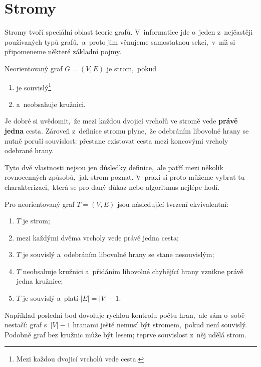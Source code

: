 \section{Stromy}\label{sec:stromy}

Stromy tvoří speciální oblast teorie grafů. V~informatice jde o~jeden z~nejčastěji používaných typů grafů,~a~proto jim věnujeme samostatnou sekci,~v~níž si připomeneme některé základní pojmy.

\begin{definition}[Strom]\label{def:strom}
    Neorientovaný graf $G=(V,E)$ je strom,~pokud
    \begin{enumerate}[label=(\roman*)]
        \item je souvislý\footnote{Mezi každou dvojicí vrcholů vede cesta.}
        \item a~neobsahuje kružnici.
    \end{enumerate}
\end{definition}

Je dobré si uvědomit,~že mezi každou dvojicí vrcholů ve stromě vede \textbf{právě jedna} cesta. Zároveň z~definice stromu plyne,~že odebráním libovolné hrany se nutně poruší souvislost: přestane existovat cesta mezi koncovými vrcholy odebrané hrany.

Tyto dvě vlastnosti nejsou jen důsledky definice,~ale patří mezi několik rovnocenných způsobů,~jak strom poznat. V~praxi si proto můžeme vybrat tu charakterizaci,~která se pro daný důkaz nebo algoritmus nejlépe hodí.

\begin{theorem}\label{thm:charakterizace_stromu}
    Pro neorientovaný graf $T=(V,E)$ jsou následující tvrzení ekvivalentní:
    \begin{enumerate}[label=(\roman*)]
        \item $T$ je strom;
        \item mezi každými dvěma vrcholy vede právě jedna cesta;
        \item $T$ je souvislý a~odebráním libovolné hrany se stane nesouvislým;
        \item $T$ neobsahuje kružnici a~přidáním libovolné chybějící hrany vznikne právě jedna kružnice;
        \item $T$ je souvislý a~platí $|E|=|V|-1$.
    \end{enumerate}
\end{theorem}

Například poslední bod dovoluje rychlou kontrolu počtu hran,~ale sám o~sobě nestačí: graf s~$|V|-1$ hranami ještě nemusí být stromem,~pokud není souvislý. Podobně graf bez kružnic může být lesem; teprve souvislost z~něj udělá strom.

